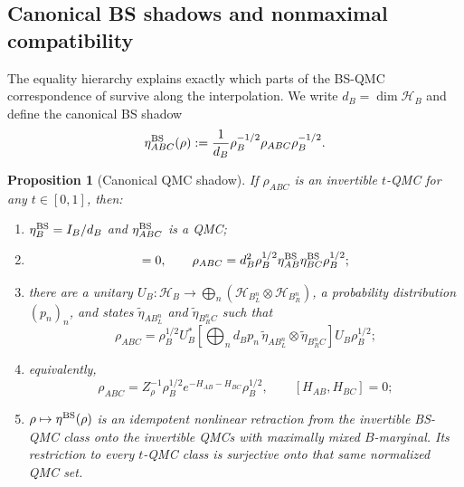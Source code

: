\documentclass[11pt]{article}
\newtheorem{proposition}[proposition]{Proposition}
\theoremstyle{remark}
\newcommand{\1}{\mathbbm{1}}
\begin{document}
\subsection{Canonical BS shadows and nonmaximal compatibility}

The equality hierarchy explains exactly which parts of the BS-QMC
correspondence of \cite{Bluhm:2025kai} survive along the
interpolation.  We write
$d_B=\dim\mathcal H_B$ and define the canonical BS shadow
\begin{equation}
 \eta^{\rm BS}_{ABC}(\rho)
 :=\frac1{d_B}\rho_B^{-1/2}\rho_{ABC}\rho_B^{-1/2}.
 \label{eq:consolidated-BS-shadow}
\end{equation}

\begin{proposition}[Canonical QMC shadow]
\label{prop:consolidated-canonical-shadow}
If $\rho_{ABC}$ is an invertible $t$-QMC for any
$t\in[0,1]$, then:
\begin{enumerate}
\item $\eta_B^{\rm BS}=I_B/d_B$ and
$\eta_{ABC}^{\rm BS}$ is a QMC;
\item
\begin{equation}
 [\eta_{AB}^{\rm BS},\eta_{BC}^{\rm BS}]=0,\qquad
 \rho_{ABC}
 =d_B^2\rho_B^{1/2}
  \eta_{AB}^{\rm BS}\eta_{BC}^{\rm BS}\rho_B^{1/2};
 \label{eq:consolidated-shadow-product}
\end{equation}
\item there are a unitary
$U_B:\mathcal H_B\to\bigoplus_n
 (\mathcal H_{B_L^n}\otimes\mathcal H_{B_R^n})$, a probability
distribution $(p_n)_n$, and states
$\widetilde\eta_{AB_L^n}$ and
$\widetilde\eta_{B_R^nC}$ such that
\begin{equation}
 \rho_{ABC}
 =\rho_B^{1/2}U_B^*\left[
 \bigoplus_n d_Bp_n\,
 \widetilde\eta_{AB_L^n}\otimes
 \widetilde\eta_{B_R^nC}\right]U_B\rho_B^{1/2};
 \label{eq:consolidated-shadow-block}
\end{equation}
\item equivalently,
\begin{equation}
 \rho_{ABC}=Z_\rho^{-1}\rho_B^{1/2}
 e^{-H_{AB}-H_{BC}}\rho_B^{1/2},
 \qquad [H_{AB},H_{BC}]=0;
 \label{eq:consolidated-shadow-Gibbs}
\end{equation}
\item $\rho\mapsto\eta^{\rm BS}(\rho)$ is an idempotent nonlinear
retraction from the invertible BS-QMC class onto the invertible QMCs with
maximally mixed $B$-marginal.  Its restriction to every
$t$-QMC class is surjective onto that same normalized QMC set.
\end{enumerate}
\end{proposition}
\end{document}
